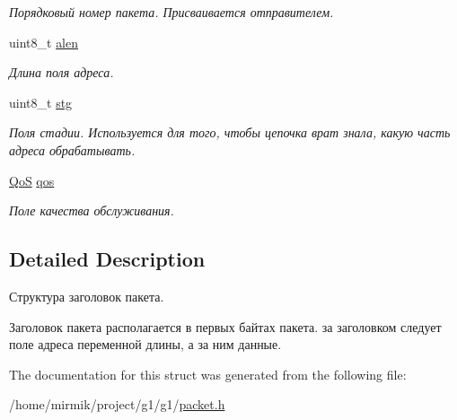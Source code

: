 \begin{DoxyCompactItemize}
\begin{DoxyCompactList}\small\item\em Порядковый номер пакета. Присваивается отправителем. \end{DoxyCompactList}\item 
uint8\+\_\+t \hyperlink{structg1_1_1packet__header_aadecf162728b76d0c72b30c6fe90774f}{alen}\hypertarget{structg1_1_1packet__header_aadecf162728b76d0c72b30c6fe90774f}{}\label{structg1_1_1packet__header_aadecf162728b76d0c72b30c6fe90774f}

\begin{DoxyCompactList}\small\item\em Длина поля адреса. \end{DoxyCompactList}\item 
uint8\+\_\+t \hyperlink{structg1_1_1packet__header_a47c2109902b4ce5d558bbac33e0b626f}{stg}\hypertarget{structg1_1_1packet__header_a47c2109902b4ce5d558bbac33e0b626f}{}\label{structg1_1_1packet__header_a47c2109902b4ce5d558bbac33e0b626f}

\begin{DoxyCompactList}\small\item\em Поля стадии. Используется для того, чтобы цепочка врат знала, какую часть адреса обрабатывать. \end{DoxyCompactList}\item 
\hyperlink{packet_8h_a157fb77f1b8142697dc1b88efaae6a0a}{QoS} \hyperlink{structg1_1_1packet__header_a556522406f886708bb389d14375c79b4}{qos}\hypertarget{structg1_1_1packet__header_a556522406f886708bb389d14375c79b4}{}\label{structg1_1_1packet__header_a556522406f886708bb389d14375c79b4}

\begin{DoxyCompactList}\small\item\em Поле качества обслуживания. \end{DoxyCompactList}\end{DoxyCompactItemize}


\subsection{Detailed Description}
Структура заголовок пакета. 

Заголовок пакета располагается в первых байтах пакета. за заголовком следует поле адреса переменной длины, а за ним данные. 

The documentation for this struct was generated from the following file\+:\begin{DoxyCompactItemize}
\item 
/home/mirmik/project/g1/g1/\hyperlink{packet_8h}{packet.\+h}\end{DoxyCompactItemize}
